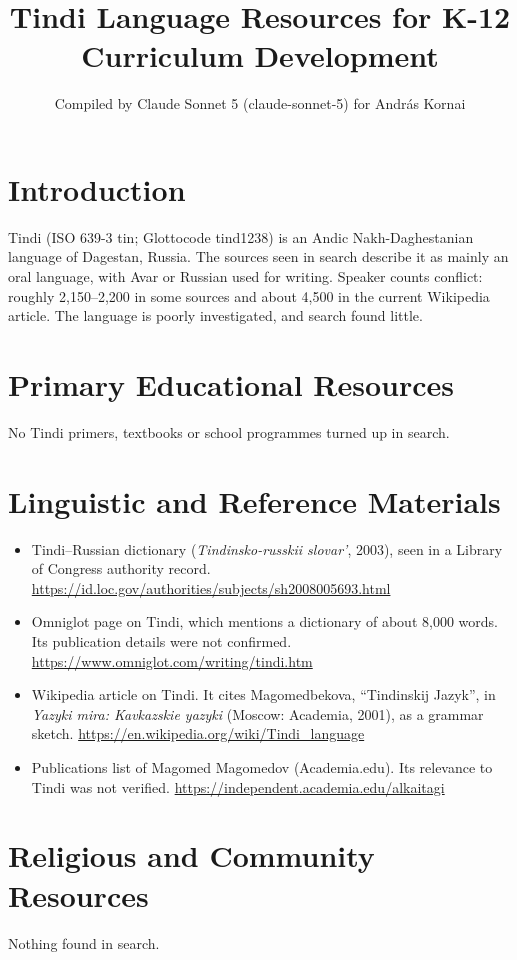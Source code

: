 \documentclass[12pt]{article}
\title{Tindi Language Resources for K-12 Curriculum Development}
\author{Compiled by Claude Sonnet 5 (claude-sonnet-5) for Andr\'as Kornai}
\date{}
\begin{document}
\maketitle

\section{Introduction}
Tindi (ISO 639-3 tin; Glottocode tind1238) is an Andic Nakh-Daghestanian language of Dagestan, Russia. The sources seen in search describe it as mainly an oral language, with Avar or Russian used for writing. Speaker counts conflict: roughly 2,150--2,200 in some sources and about 4,500 in the current Wikipedia article. The language is poorly investigated, and search found little.

\section{Primary Educational Resources}
No Tindi primers, textbooks or school programmes turned up in search.

\section{Linguistic and Reference Materials}
\begin{itemize}
\item Tindi--Russian dictionary (\emph{Tindinsko-russkii slovar'}, 2003), seen in a Library of Congress authority record. \url{https://id.loc.gov/authorities/subjects/sh2008005693.html}
\item Omniglot page on Tindi, which mentions a dictionary of about 8,000 words. Its publication details were not confirmed. \url{https://www.omniglot.com/writing/tindi.htm}
\item Wikipedia article on Tindi. It cites Magomedbekova, ``Tindinskij Jazyk'', in \emph{Yazyki mira: Kavkazskie yazyki} (Moscow: Academia, 2001), as a grammar sketch. \url{https://en.wikipedia.org/wiki/Tindi_language}
\item Publications list of Magomed Magomedov (Academia.edu). Its relevance to Tindi was not verified. \url{https://independent.academia.edu/alkaitagi}
\end{itemize}

\section{Religious and Community Resources}
Nothing found in search.
\end{document}
